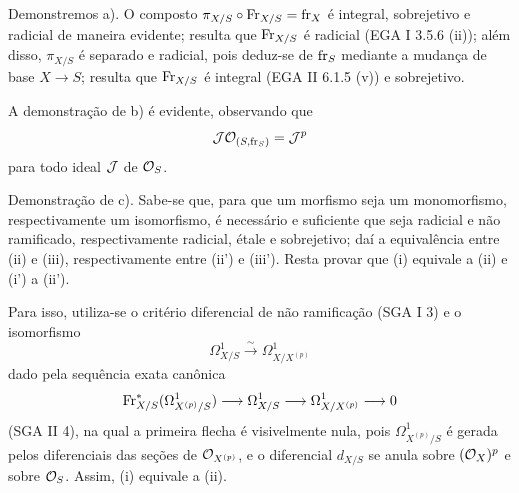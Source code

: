 Demonstremos a). O composto $\pi_{X/S}\circ\operatorname{Fr}_{X/S}=\operatorname{fr}_X$ é integral, sobrejetivo e radicial de maneira evidente; resulta que $\operatorname{Fr}_{X/S}$ é radicial (EGA I 3.5.6 (ii)); além disso, $\pi_{X/S}$ é separado e radicial, pois deduz-se de $\operatorname{fr}_S$ mediante a mudança de base $X\to S$; resulta que $\operatorname{Fr}_{X/S}$ é integral (EGA II 6.1.5 (v)) e sobrejetivo.

A demonstração de b) é evidente, observando que
\[
\mathcal J\mathcal{O}_{(S,\operatorname{fr}_S)}=\mathcal J^p
\]
para todo ideal $\mathcal J$ de $\mathcal{O}_S$.

Demonstração de c). Sabe-se que, para que um morfismo seja um monomorfismo, respectivamente um isomorfismo, é necessário e suficiente que seja radicial e não ramificado, respectivamente radicial, étale e sobrejetivo; daí a equivalência entre (ii) e (iii), respectivamente entre (ii') e (iii'). Resta provar que (i) equivale a (ii) e (i') a (ii').

Para isso, utiliza-se o critério diferencial de não ramificação (SGA I 3) e o isomorfismo
\[
\Omega^1_{X/S}\xrightarrow{\sim} \Omega^1_{X/X^{(p)}}
\]
dado pela sequência exata canônica
\[
\operatorname{Fr}_{X/S}^*(\Omega^1_{X^{(p)}/S})\longrightarrow \Omega^1_{X/S}
\longrightarrow \Omega^1_{X/X^{(p)}}\longrightarrow 0
\]
(SGA II 4), na qual a primeira flecha é visivelmente nula, pois $\Omega^1_{X^{(p)}/S}$ é gerada pelos diferenciais das seções de $\mathcal{O}_{X^{(p)}}$, e o diferencial $d_{X/S}$ se anula sobre $(\mathcal{O}_X)^p$ e sobre $\mathcal{O}_S$. Assim, (i) equivale a (ii).
